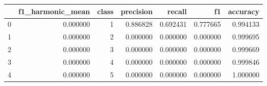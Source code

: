 \begin{tabular}{lrrrrrr}
\toprule
 & f1_harmonic_mean & class & precision & recall & f1 & accuracy \\
\midrule
0 & 0.000000 & 1 & 0.886828 & 0.692431 & 0.777665 & 0.994133 \\
1 & 0.000000 & 2 & 0.000000 & 0.000000 & 0.000000 & 0.999695 \\
2 & 0.000000 & 3 & 0.000000 & 0.000000 & 0.000000 & 0.999669 \\
3 & 0.000000 & 4 & 0.000000 & 0.000000 & 0.000000 & 0.999846 \\
4 & 0.000000 & 5 & 0.000000 & 0.000000 & 0.000000 & 1.000000 \\
\bottomrule
\end{tabular}
